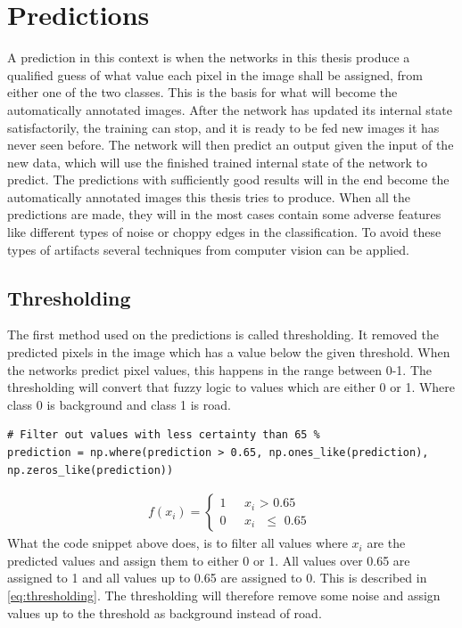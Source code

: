 \documentclass[USenglish]{ifimaster}  %
\begin{document}
\section{Predictions}
A prediction in this context is when the networks in this thesis produce a qualified guess of what value each pixel in the image shall be assigned, from either one of the two classes. This is the basis for what will become the automatically annotated images. After the network has updated its internal state satisfactorily, the training can stop, and it is ready to be fed new images it has never seen before. The network will then predict an output given the input of the new data, which will use the finished trained internal state of the network to predict. The predictions with sufficiently good results will in the end become the automatically annotated images this thesis tries to produce. When all the predictions are made, they will in the most cases contain some adverse features like different types of noise or choppy edges in the classification. To avoid these types of artifacts several techniques from computer vision can be applied.

\subsection{Thresholding}
The first method used on the predictions is called thresholding. It removed the predicted pixels in the image which has a value below the given threshold. When the networks predict pixel values, this happens in the range between 0-1. The thresholding will convert that fuzzy logic to values which are either 0 or 1. Where class 0 is background and class 1 is road.
\begin{verbatim}
# Filter out values with less certainty than 65 %
prediction = np.where(prediction > 0.65, np.ones_like(prediction), 
np.zeros_like(prediction))
\end{verbatim}

\begin{equation}\label{eq:thresholding}
\begin{aligned}
{f(x_i)=
\begin{cases}
    1 & \text{ $x_i$ > 0.65 }  \\
    0 & \text{ $x_i$ $\leq$ 0.65 }
\end{cases}}
\end{aligned}
\end{equation}
What the code snippet above does, is to filter all values where $x_i$ are the predicted values and assign them to either 0 or 1. All values over 0.65 are assigned to 1 and all values up to 0.65 are assigned to 0. This is described in \cref{eq:thresholding}. The thresholding will therefore remove some noise and assign values up to the threshold as background instead of road.
\end{document}
